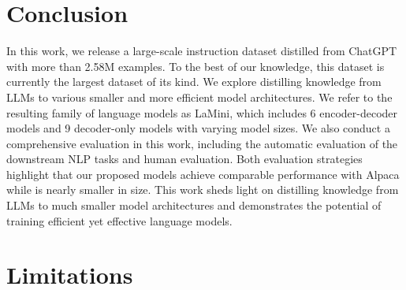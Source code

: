 \documentclass[11pt]{article}
\newcommand{\modelname}{LaMini\xspace}
\begin{document}
 \section{Conclusion}

In this work, we release a large-scale instruction dataset distilled from ChatGPT with more than 2.58M examples. To the best of our knowledge, this dataset is currently the largest dataset of its kind. We explore distilling knowledge from LLMs to various smaller and more efficient model architectures. We refer to the resulting family of language models as \modelname, which includes 6 encoder-decoder models and 9 decoder-only models with varying model sizes. We also conduct a comprehensive evaluation in this work, including the automatic evaluation of the downstream NLP tasks and human evaluation. Both evaluation strategies highlight that our proposed models achieve comparable performance with Alpaca \cite{alpaca} while is nearly  smaller in size. This work sheds light on distilling knowledge from LLMs to much smaller model architectures and demonstrates the potential of training efficient yet effective language models.




 \section{Limitations}
\label{sec:limitations}
\end{document}
